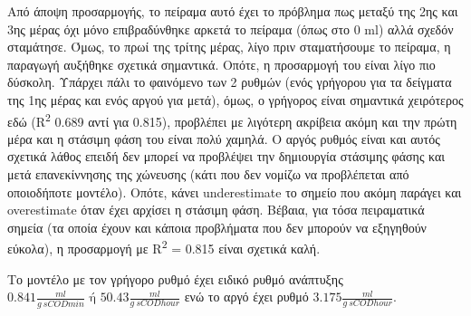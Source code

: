 \documentclass[11pt]{article}
\begin{document}
Από άποψη προσαρμογής, το πείραμα αυτό έχει το πρόβλημα πως μεταξύ της 2ης και 3ης μέρας όχι μόνο επιβραδύνθηκε αρκετά το πείραμα (όπως στο 0 ml) αλλά σχεδόν σταμάτησε. Όμως, το πρωί της τρίτης μέρας, λίγο πριν σταματήσουμε το πείραμα, η παραγωγή αυξήθηκε σχετικά σημαντικά. Οπότε, η προσαρμογή του είναι λίγο πιο δύσκολη. Υπάρχει πάλι το φαινόμενο των 2 ρυθμών (ενός γρήγορου για τα δείγματα της 1ης μέρας και ενός αργού για μετά), όμως, ο γρήγορος είναι σημαντικά χειρότερος εδώ (R\textsuperscript{2} 0.689 αντί για 0.815), προβλέπει με λιγότερη ακρίβεια ακόμη και την πρώτη μέρα και η στάσιμη φάση του είναι πολύ χαμηλά. Ο αργός ρυθμός είναι και αυτός σχετικά λάθος επειδή δεν μπορεί να προβλέψει την δημιουργία στάσιμης φάσης και μετά επανεκίννησης της χώνευσης (κάτι που δεν νομίζω να προβλέπεται από οποιοδήποτε μοντέλο). Οπότε, κάνει underestimate το σημείο που ακόμη παράγει και overestimate όταν έχει αρχίσει η στάσιμη φάση. Βέβαια, για τόσα πειραματικά σημεία (τα οποία έχουν και κάποια προβλήματα που δεν μπορούν να εξηγηθούν εύκολα), η προσαρμογή με R\textsuperscript{2} = 0.815 είναι σχετικά καλή.

Το μοντέλο με τον γρήγορο ρυθμό έχει ειδικό ρυθμό ανάπτυξης \(0.841 \frac{ml}{g ~ sCOD min } \text{ ή } 50.43 \frac{ml}{g ~ sCOD hour}\) ενώ το αργό έχει ρυθμό \(3.175 \frac{ml}{g ~ sCOD hour}\).
\end{document}
